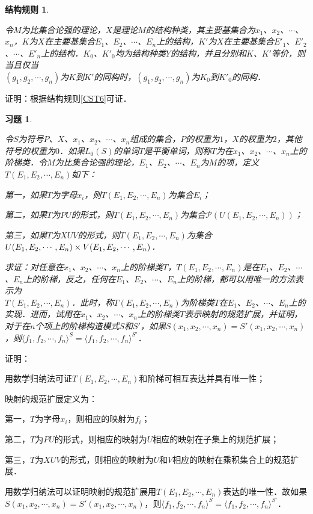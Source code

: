 \documentclass[12pt, a4paper, oneside]{book}
\newtheorem{CST}{结构规则}
\newtheorem{exer}{习题}
\begin{document}
			\begin{CST}\label{CST7}
				\hfill\par
				令$M$为比集合论强的理论，$X$是理论$M$的结构种类，其主要基集合为$x_1$、$x_2$、$\cdots$、$x_n$，$K$为$X$在主要基集合$E_1$、$E_2$、$\cdots$、$E_n$上的结构，$K'$为$X$在主要基集合${E'}_1$、${E'}_2$、$\cdots$、${E'}_n$上的结构．$K_0$、${K'}_0$均为结构种类$Y$的结构，并且分别和$K$、$K'$等价，则当且仅当\\$(g_1, g_2, \cdots, g_n)$为$K$到$K'$的同构时，$(g_1, g_2, \cdots, g_n)$为$K_0$到${K'}_0$的同构．
			\end{CST}
			证明：根据结构规则\ref{CST6}可证．
			
			\begin{exer}\label{exer198}
				\hfill\par
				令$S$为符号$P$、$X$、$x_1$、$x_2$、$\cdots$、$x_n$组成的集合，$P$的权重为$1$，$X$的权重为$2$，其他符号的权重为$0$．如果$L_0(S)$的单词$T$是平衡单词，则称$T$为在$x_1$、$x_2$、$\cdots$、$x_n$上的阶梯类．令$M$为比集合论强的理论，$E_1$、$E_2$、$\cdots$、$E_n$为$M$的项，定义$T(E_1, E_2, \cdots, E_n)$如下：
				\par
				第一，如果$T$为字母$x_i$，则$T(E_1, E_2, \cdots, E_n)$为集合$E_i$；
				\par
				第二，如果$T$为$PU$的形式，则$T(E_1, E_2, \cdots, E_n)$为集合$\mathcal{P}(U(E_1, E_2, \cdots, E_n))$；
				\par
				第三，如果$T$为$XUV$的形式，则$T(E_1, E_2, \cdots, E_n)$为集合$U(E_1, E_2, \cdots, E_n)\times\\V(E_1, E_2, \cdots, E_n)$．
				\par
				求证：对任意在$x_1$、$x_2$、$\cdots$、$x_n$上的阶梯类$T$，$T(E_1, E_2, \cdots, E_n)$是在$E_1$、$E_2$、$\cdots$、$E_n$上的阶梯，反之，任何在$E_1$、$E_2$、$\cdots$、$E_n$上的阶梯，都可以用唯一的方法表示为\\$T(E_1, E_2, \cdots, E_n)$．此时，称$T(E_1, E_2, \cdots, E_n)$为阶梯类$T$在$E_1$、$E_2$、$\cdots$、$E_n$上的实现．进而，试用在$x_1$、$x_2$、$\cdots$、$x_n$上的阶梯类$T$表示映射的规范扩展，并证明，对于在$n$个项上的阶梯构造模式$S$和$S'$，如果$S(x_1, x_2, \cdots, x_n)=S'(x_1, x_2, \cdots, x_n)$，则$\langle f_1, f_2, \cdots, f_n\rangle^S=\langle f_1, f_2, \cdots, f_n\rangle^{S'}$．
			\end{exer}
			证明：
			\par
			用数学归纳法可证$T(E_1, E_2, \cdots, E_n)$和阶梯可相互表达并具有唯一性；
			\par
			映射的规范扩展定义为：
			\par
			第一，$T$为字母$x_i$，则相应的映射为$f_i$；
			\par
			第二，$T$为$PU$的形式，则相应的映射为$U$相应的映射在子集上的规范扩展；
			\par
			第三，$T$为$XUV$的形式，则相应的映射为$U$和$V$相应的映射在乘积集合上的规范扩展．
			\par
			用数学归纳法可以证明映射的规范扩展用$T(E_1, E_2, \cdots, E_n)$表达的唯一性．故如果\\$S(x_1, x_2, \cdots, x_n)=S'(x_1, x_2, \cdots, x_n)$，则$\langle f_1, f_2, \cdots, f_n\rangle^S=\langle f_1, f_2, \cdots, f_n\rangle^{S'}$．
\end{document}
